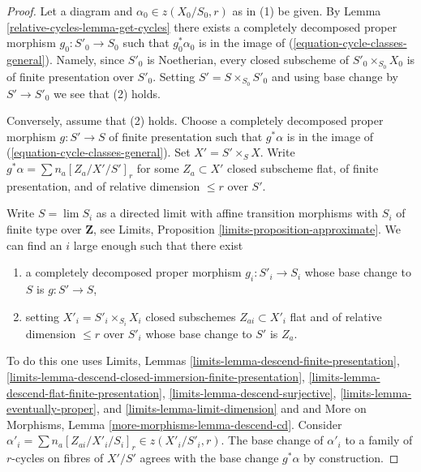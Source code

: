 \begin{proof}
Let a diagram and $\alpha_0 \in z(X_0/S_0, r)$ as in (1) be given.
By Lemma \ref{relative-cycles-lemma-get-cycles} there exists a completely decomposed proper
morphism $g_0 : S'_0 \to S_0$ such that $g_0^*\alpha_0$ is in
the image of (\ref{equation-cycle-classes-general}). Namely, since
$S'_0$ is Noetherian, every closed subscheme of $S'_0 \times_{S_0} X_0$
is of finite presentation over $S'_0$. Setting $S' = S \times_{S_0} S'_0$
and using base change by $S' \to S'_0$ we see that (2) holds.

\medskip\noindent
Conversely, assume that (2) holds. Choose a completely decomposed proper
morphism $g : S' \to S$ of finite presentation such that $g^*\alpha$ is in the
image of (\ref{equation-cycle-classes-general}). Set $X' = S' \times_S X$.
Write $g^*\alpha = \sum n_a [Z_a/X'/S']_r$ for some $Z_a \subset X'$
closed subscheme flat, of finite presentation, and of relative dimension
$\leq r$ over $S'$.

\medskip\noindent
Write $S = \lim S_i$ as a directed limit with affine transition
morphisms with $S_i$ of finite type over $\mathbf{Z}$,
see Limits, Proposition \ref{limits-proposition-approximate}.
We can find an $i$ large enough such that there exist
\begin{enumerate}
\item a completely decomposed proper morphism $g_i : S'_i \to S_i$
whose base change to $S$ is $g : S' \to S$,
\item setting $X'_i = S'_i \times_{S_i} X_i$
closed subschemes $Z_{ai} \subset X'_i$ flat and of
relative dimension $\leq r$ over $S'_i$ whose base change to $S'$
is $Z_a$.
\end{enumerate}
To do this one uses Limits, Lemmas
\ref{limits-lemma-descend-finite-presentation},
\ref{limits-lemma-descend-closed-immersion-finite-presentation},
\ref{limits-lemma-descend-flat-finite-presentation},
\ref{limits-lemma-descend-surjective},
\ref{limits-lemma-eventually-proper}, and
\ref{limits-lemma-limit-dimension}
and
and More on Morphisms, Lemma
\ref{more-morphisms-lemma-descend-cd}.
Consider $\alpha'_i = \sum n_a [Z_{ai}/X'_i/S_i]_r \in z(X'_i/S'_i, r)$.
The base change of $\alpha'_i$ to a family of $r$-cycles on fibres
of $X'/S'$ agrees with the base change $g^*\alpha$ by construction.


\end{proof}
